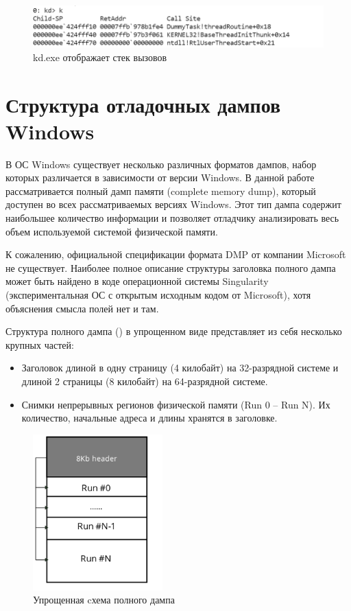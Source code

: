 \documentclass{mipt-thesis-bs}
\begin{document}
\begin{figure}[h]
\begin{center}
    \includegraphics[width=1\textwidth]{k.png}
    \caption{kd.exe отображает стек вызовов}
    \label{fig:kdk}
\end{center}
\end{figure}


\chapter{Структура отладочных дампов Windows}

В ОС Windows существует несколько различных форматов дампов, набор которых различается в зависимости от версии Windows\cite{dumps}. В данной работе рассматривается полный дамп памяти (complete memory dump), который доступен во всех рассматриваемых версиях Windows. Этот тип дампа содержит наибольшее количество информации и позволяет отладчику анализировать весь объем используемой системой физической памяти\cite{completedump}.

К сожалению, официальной спецификации формата DMP от компании Microsoft не существует. Наиболее полное описание структуры заголовка полного дампа может быть найдено в коде операционной системы Singularity (экспериментальная ОС с открытым исходным кодом от Microsoft)\cite{mssing}, хотя объяснения смысла полей нет и там.

Структура полного дампа () в упрощенном виде представляет из себя несколько крупных частей:

\begin{itemize}
    \item Заголовок длиной в одну страницу (4 килобайт) на 32-разрядной системе и длиной 2 страницы (8 килобайт) на 64-разрядной системе.
    \item Снимки непрерывных регионов физической памяти (Run 0 -- Run N). Их количество, начальные адреса и длины хранятся в заголовке.
\end{itemize}

\begin{figure}[h]
\begin{center}
    \includegraphics[width=5cm]{dmp_scheme1.png}
    \caption{Упрощенная cхема полного дампа}
    \label{fig:dmp-scheme}
\end{center}
\end{figure}
\end{document}
